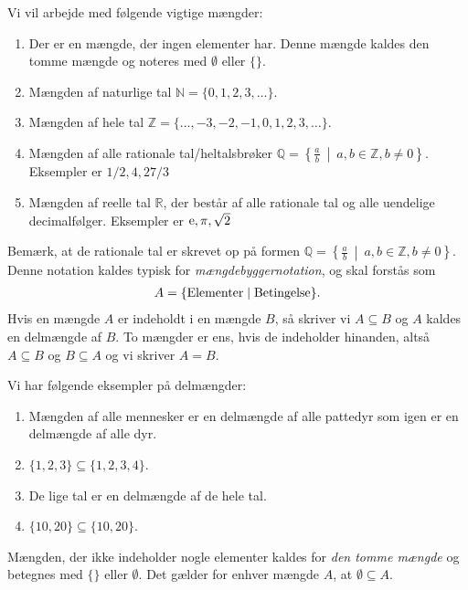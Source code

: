 \begin{exa}
Vi vil arbejde med følgende vigtige mængder:
\begin{enumerate}[label=\roman*)]
\item Der er en mængde, der ingen elementer har. Denne mængde kaldes den tomme mængde og noteres med $\emptyset$ eller $\{\}$. 
\item Mængden af naturlige tal $\mathbb{N} = \{0,1,2,3,\hdots\}$.
\item Mængden af hele tal $\mathbb{Z} = \{\hdots,-3,-2,-1,0,1,2,3,\hdots \}$.
\item Mængden af alle rationale tal/heltalsbrøker $\mathbb{Q} = \left\{\frac{a}{b} \ \middle | \ a,b\in \mathbb{Z}, b \neq 0\right\}$. Eksempler er $1/2, 4, 27/3$
\item Mængden af reelle tal $\mathbb{R}$, der består af alle rationale tal og alle uendelige decimalfølger. Eksempler er $\textnormal{e},\pi, \sqrt{2}$
\end{enumerate}
\end{exa} Bemærk, at de rationale tal er skrevet op på formen $\mathbb{Q} = \left\{ \frac{a}{b} \ \middle | \ a,b \in \mathbb{Z}, b \neq 0 \right\}$. Denne notation kaldes typisk for \textit{mængdebyggernotation}, og skal forstås som 
\begin{align*}
	A = \{ \textnormal{Elementer} \mid  \textnormal{Betingelse}\}.
\end{align*}
Hvis en mængde $A$ er indeholdt i en mængde $B$, så skriver vi $A\subseteq B$ og $A$ kaldes en delmængde af $B$. To mængder er ens, hvis de indeholder hinanden, altså $A\subseteq B$ og $B\subseteq A$ og vi skriver $A=B$. 
\begin{exa}
Vi har følgende eksempler på delmængder:
\begin{enumerate}[label=\roman*)]
\item Mængden af alle mennesker er en delmængde af alle pattedyr som igen er en delmængde af alle dyr.
\item $\{1,2,3\} \subseteq \{1,2,3,4\}$.
\item De lige tal er en delmængde af de hele tal.  
\item $\{10,20\}\subseteq \{10,20\}$.
\end{enumerate}
\end{exa}
\begin{exa}
	Mængden, der ikke indeholder nogle elementer kaldes for \textit{den tomme mængde} og betegnes med $\{\}$ eller $\emptyset$. Det gælder for enhver mængde $A$, at 
	$\emptyset \subseteq A$.
\end{exa}

